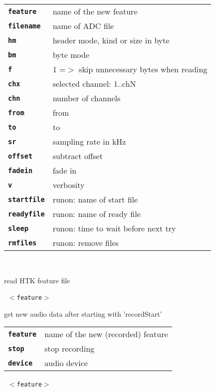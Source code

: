 \begin{description}
\begin{description}
      \begin{tabular}{ll}
 \texttt{\textbf{feature}} &   name of the new feature \\
 \texttt{\textbf{filename}} &  name of ADC file  \\
 \texttt{\textbf{hm}} &         header mode, kind or size in byte  \\
 \texttt{\textbf{bm}} &         byte mode  \\
 \texttt{\textbf{f}} &          1 =$>$ skip unnecessary bytes when reading  \\
 \texttt{\textbf{chx}} &        selected channel: 1..chN  \\
 \texttt{\textbf{chn}} &        number of channels  \\
 \texttt{\textbf{from}} &       from  \\
 \texttt{\textbf{to}} &         to  \\
 \texttt{\textbf{sr}} &         sampling rate in kHz  \\
 \texttt{\textbf{offset}} &     subtract offset  \\
 \texttt{\textbf{fadein}} &     fade in  \\
 \texttt{\textbf{v}} &          verbosity  \\
 \texttt{\textbf{startfile}} &  runon: name of start file  \\
 \texttt{\textbf{readyfile}} &  runon: name of ready file  \\
 \texttt{\textbf{sleep}} &      runon: time to wait before next try  \\
 \texttt{\textbf{rmfiles}} &    runon: remove files  \\
      \end{tabular}
       \texttt{} \

        read HTK feature file

       \texttt{ $<$feature$>$  } \

        get new audio data after starting with 'recordStart'

      \begin{tabular}{ll}
 \texttt{\textbf{feature}} &  name of the new (recorded) feature \\
 \texttt{\textbf{stop}} &      stop recording  \\
 \texttt{\textbf{device}} &    audio device  \\
      \end{tabular}
       \texttt{ $<$feature$>$ } \


\end{description}
\end{description}
